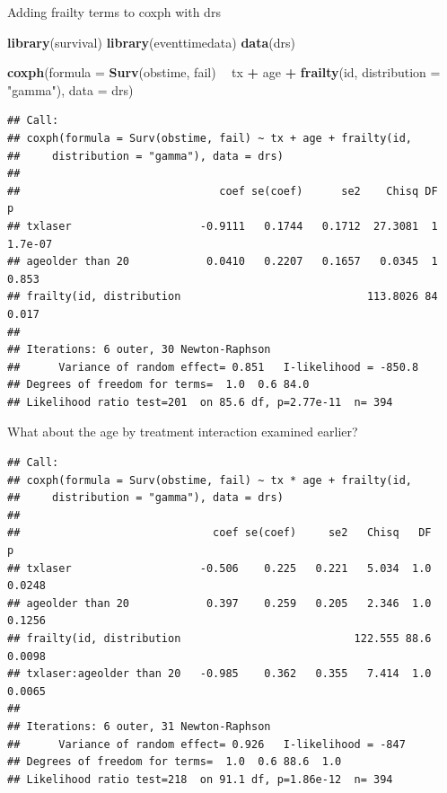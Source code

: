 \documentclass[ignorenonframetext,]{beamer}
\newenvironment{Shaded}{\begin{snugshade}}{\end{snugshade}}
\newcommand{\DataTypeTok}[1]{\textcolor[rgb]{0.13,0.29,0.53}{#1}}
\newcommand{\KeywordTok}[1]{\textcolor[rgb]{0.13,0.29,0.53}{\textbf{#1}}}
\newcommand{\NormalTok}[1]{#1}
\newcommand{\OperatorTok}[1]{\textcolor[rgb]{0.81,0.36,0.00}{\textbf{#1}}}
\newcommand{\StringTok}[1]{\textcolor[rgb]{0.31,0.60,0.02}{#1}}
\begin{document}
\begin{frame}[fragile]{%
\protect\hypertarget{adding-frailty-terms-to-coxph-with-drs}{%
Adding frailty terms to coxph with drs}}

\scriptsize

\begin{Shaded}
\begin{Highlighting}[]
\KeywordTok{library}\NormalTok{(survival)}
\KeywordTok{library}\NormalTok{(eventtimedata)}
\KeywordTok{data}\NormalTok{(drs)}

\KeywordTok{coxph}\NormalTok{(}\DataTypeTok{formula =} \KeywordTok{Surv}\NormalTok{(obstime, fail) }\OperatorTok{~}\StringTok{ }\NormalTok{tx }\OperatorTok{+}\StringTok{ }\NormalTok{age }\OperatorTok{+}\StringTok{ }
\StringTok{        }\KeywordTok{frailty}\NormalTok{(id, }\DataTypeTok{distribution =} \StringTok{"gamma"}\NormalTok{), }\DataTypeTok{data =}\NormalTok{ drs)}
\end{Highlighting}
\end{Shaded}

\begin{verbatim}
## Call:
## coxph(formula = Surv(obstime, fail) ~ tx + age + frailty(id, 
##     distribution = "gamma"), data = drs)
## 
##                               coef se(coef)      se2    Chisq DF       p
## txlaser                    -0.9111   0.1744   0.1712  27.3081  1 1.7e-07
## ageolder than 20            0.0410   0.2207   0.1657   0.0345  1   0.853
## frailty(id, distribution                             113.8026 84   0.017
## 
## Iterations: 6 outer, 30 Newton-Raphson
##      Variance of random effect= 0.851   I-likelihood = -850.8 
## Degrees of freedom for terms=  1.0  0.6 84.0 
## Likelihood ratio test=201  on 85.6 df, p=2.77e-11  n= 394
\end{verbatim}

\end{frame}

\begin{frame}[fragile]{%
\protect\hypertarget{what-about-the-age-by-treatment-interaction-examined-earlier}{%
What about the age by treatment interaction examined earlier?}}

\scriptsize

\begin{verbatim}
## Call:
## coxph(formula = Surv(obstime, fail) ~ tx * age + frailty(id, 
##     distribution = "gamma"), data = drs)
## 
##                              coef se(coef)     se2   Chisq   DF      p
## txlaser                    -0.506    0.225   0.221   5.034  1.0 0.0248
## ageolder than 20            0.397    0.259   0.205   2.346  1.0 0.1256
## frailty(id, distribution                           122.555 88.6 0.0098
## txlaser:ageolder than 20   -0.985    0.362   0.355   7.414  1.0 0.0065
## 
## Iterations: 6 outer, 31 Newton-Raphson
##      Variance of random effect= 0.926   I-likelihood = -847 
## Degrees of freedom for terms=  1.0  0.6 88.6  1.0 
## Likelihood ratio test=218  on 91.1 df, p=1.86e-12  n= 394
\end{verbatim}

\end{frame}
\end{document}
